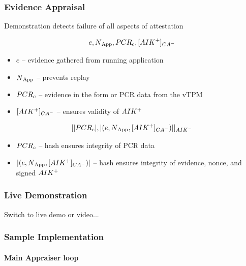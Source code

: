 \documentclass{beamer}
\def \app {App}
\def \pcomp {PCR\textsubscript{c}}
\def \eve {e}
\def \cacert {\sign {\public{AIK}}{CA}}
\def \exdata {\hash{(\eve, \nonce{\app}, \cacert ) }}
\begin{document}
\begin{frame}
  \frametitle{Evidence Appraisal}

  \begin{center}
    {\color{kublue}Demonstration detects failure of all aspects of attestation}
  \end{center}

  \[\eve, \nonce{\app}, \pcomp, \cacert\]

  \begin{itemize}
  \item $\eve$ -- evidence gathered from running application
  \item $\nonce{\app}$ -- prevents replay
  \item $\pcomp$ -- evidence in the form or PCR data from the vTPM
  \item $\cacert$ -- ensures validity of $AIK^{+}$
  \end{itemize}

  \[\sign{\hash{\pcomp}, \exdata}{AIK}\]

  \begin{itemize}
  \item $\pcomp$ -- hash ensures integrity of PCR data
  \item $\exdata$ -- hash ensures integrity of evidence, nonce, and
    signed $AIK^{+}$
  \end{itemize}
\end{frame}

\begin{frame}
  \frametitle{Live Demonstration}
  \begin{center}
    {\color{kublue}Switch to live demo or video...}
  \end{center}
\end{frame}

\begin{frame}[fragile]
  \frametitle{Sample Implementation}
  \framesubtitle{Main Appraiser loop}
  \begin{tiny}
  \begin{center}
  
  \end{center}
%  
  \end{tiny}
\end{frame}
\end{document}
